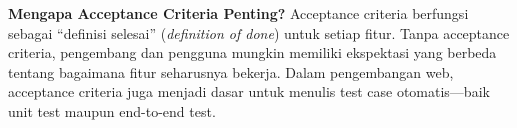 \begin{konsep}
\textbf{Mengapa Acceptance Criteria Penting?} Acceptance criteria berfungsi sebagai ``definisi selesai'' (\textit{definition of done}) untuk setiap fitur. Tanpa acceptance criteria, pengembang dan pengguna mungkin memiliki ekspektasi yang berbeda tentang bagaimana fitur seharusnya bekerja. Dalam pengembangan web, acceptance criteria juga menjadi dasar untuk menulis test case otomatis---baik unit test maupun end-to-end test.
\end{konsep}
